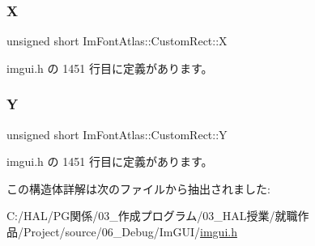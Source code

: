 \subsubsection{\texorpdfstring{X}{X}}
{\footnotesize\ttfamily unsigned short Im\+Font\+Atlas\+::\+Custom\+Rect\+::X}



 imgui.\+h の 1451 行目に定義があります。

\mbox{\label{struct_im_font_atlas_1_1_custom_rect_ae1739c480b82fa11ebdd1edb9e3cf5eb}} 
\subsubsection{\texorpdfstring{Y}{Y}}
{\footnotesize\ttfamily unsigned short Im\+Font\+Atlas\+::\+Custom\+Rect\+::Y}



 imgui.\+h の 1451 行目に定義があります。



この構造体詳解は次のファイルから抽出されました\+:\begin{DoxyCompactItemize}
\item 
C\+:/\+H\+A\+L/\+P\+G関係/03\+\_\+作成プログラム/03\+\_\+\+H\+A\+L授業/就職作品/\+Project/source/06\+\_\+\+Debug/\+Im\+G\+U\+I/\mbox{\hyperlink{imgui_8h}{imgui.\+h}}\end{DoxyCompactItemize}
